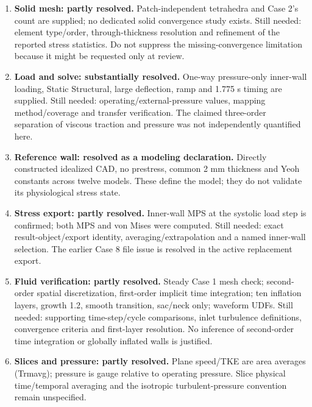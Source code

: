 \documentclass[11pt,a4paper]{article}
\begin{document}
\begin{enumerate}
\item \textbf{Solid mesh: partly resolved.} Patch-independent tetrahedra and Case 2's count are supplied; no dedicated solid convergence study exists. Still needed: element type/order, through-thickness resolution and refinement of the reported stress statistics. Do not suppress the missing-convergence limitation because it might be requested only at review.
\item \textbf{Load and solve: substantially resolved.} One-way pressure-only inner-wall loading, Static Structural, large deflection, ramp and 1.775 s timing are supplied. Still needed: operating/external-pressure values, mapping method/coverage and transfer verification. The claimed three-order separation of viscous traction and pressure was not independently quantified here.
\item \textbf{Reference wall: resolved as a modeling declaration.} Directly constructed idealized CAD, no prestress, common 2 mm thickness and Yeoh constants across twelve models. These define the model; they do not validate its physiological stress state.
\item \textbf{Stress export: partly resolved.} Inner-wall MPS at the systolic load step is confirmed; both MPS and von Mises were computed. Still needed: exact result-object/export identity, averaging/extrapolation and a named inner-wall selection. The earlier Case 8 file issue is resolved in the active replacement export.
\item \textbf{Fluid verification: partly resolved.} Steady Case 1 mesh check; second-order spatial discretization, first-order implicit time integration; ten inflation layers, growth 1.2, smooth transition, sac/neck only; waveform UDFs. Still needed: supporting time-step/cycle comparisons, inlet turbulence definitions, convergence criteria and first-layer resolution. No inference of second-order time integration or globally inflated walls is justified.
\item \textbf{Slices and pressure: partly resolved.} Plane speed/TKE are area averages (Trmavg); pressure is gauge relative to operating pressure. Slice physical time/temporal averaging and the isotropic turbulent-pressure convention remain unspecified.
\end{enumerate}
\end{document}
